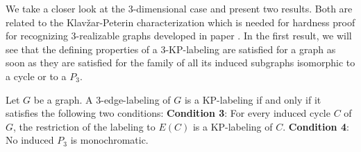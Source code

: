 \documentclass[12pt,a4paper,titlepage,openany]{report}
\begin{document}
\medskip
We take a closer look at the 3-dimensional case and present two results. Both are related to the Klav\v zar-Peterin characterization which is needed for hardness proof for recognizing 3-realizable graphs developed in paper \cite{Milanic}.\newline
In the first result, we will see that the defining properties of a 3-KP-labeling are satisfied for a graph as soon as they are satisfied for the family of all its induced subgraphs isomorphic to a cycle or to a $P_3$.

\begin{theorem}\label{3-edge-label}
Let $G$ be a graph. A 3-edge-labeling of $G$ is a KP-labeling if and only if it satisfies the following two conditions:\newline
\textbf{Condition 3}: For every induced cycle $C$ of $G$, the restriction of the labeling to $E(C)$ is
a KP-labeling of $C$.\newline
\textbf{Condition 4}: No induced $P_3$ is monochromatic.
\end{theorem}
\end{document}
